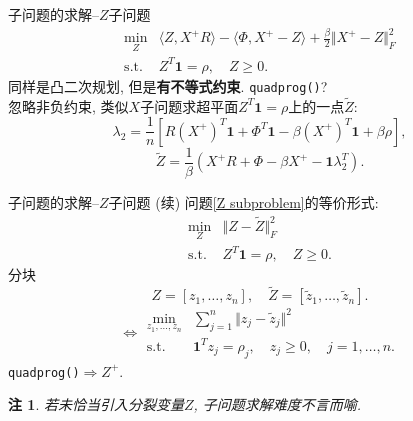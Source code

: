 \documentclass{beamer}
\newcommand{\st}{\mathrm{s.t.}}
\newcommand{\one}{\mathbf{1}}
\begin{document}
\begin{frame}{子问题的求解--$Z$子问题}
\begin{equation}
	\begin{array}{rl}
		\min\limits_Z & \langle Z,X^+R\rangle-\langle\Phi,X^+-Z\rangle+\frac{\beta}{2}\Vert X^+-Z\Vert_F^2\\
		\st & Z^T\one=\rho,\quad Z\ge0.
	\end{array}
	\label{Z subproblem}
\end{equation}
同样是凸二次规划, 但是\textbf{有不等式约束}. \pause\texttt{quadprog()}?\pause\\[1em]
忽略非负约束, 类似$X$子问题求超平面$Z^T\one=\rho$上的一点$\widetilde Z$:
$$\lambda_2=\frac{1}{n}\left[R\left(X^+\right)^T\one+\Phi^T\one-\beta\left(X^+\right)^T\one+\beta\rho\right],$$
$$\widetilde Z=\frac{1}{\beta}(X^+R+\Phi-\beta X^+-\one\lambda_2^T).$$
\end{frame}
\newtheorem{rem}{注}
\begin{frame}{子问题的求解--$Z$子问题 (续)}
问题\eqref{Z subproblem}的等价形式:
\begin{equation*}
	\begin{array}{rl}
		\min\limits_Z & \Vert Z-\widetilde Z\Vert_F^2\\
		\st & Z^T\one=\rho,\quad Z\ge0.
	\end{array}
\end{equation*}\pause
分块
$$Z=[z_1,\ldots,z_n],\quad\widetilde Z=[\tilde z_1,\ldots,\tilde z_n].$$
\begin{equation}
	\Leftrightarrow\begin{array}{rl}
		\min\limits_{z_1,\ldots,z_n} & \sum\limits_{j=1}^n\Vert z_j-\tilde z_j\Vert^2\\
		\st & \one^Tz_j=\rho_j,\quad z_j\ge0,\quad j=1,\ldots,n.
	\end{array}
	\label{Z subproblem equal 2}
\end{equation}
\texttt{quadprog()}$\Rightarrow Z^+$.\pause
\begin{rem}
若未恰当引入分裂变量$Z$, 子问题求解难度不言而喻.
\end{rem}
\end{frame}
\end{document}
